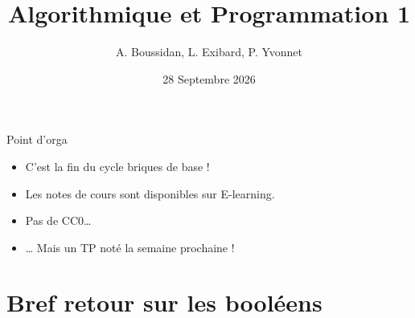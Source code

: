 \documentclass{beamer}
\title{Algorithmique et Programmation 1}
\author{A. Boussidan, L. Exibard, P. Yvonnet}
\date{28 Septembre 2026}
\begin{document}
	\begin{frame}
		\maketitle
	\end{frame}

  \begin{frame}{Point d'orga}

    \begin{itemize}
    \item C'est la fin du cycle \og briques de base\fg{} !
    \item[\MVRightarrow{}] Les notes de cours sont disponibles sur E-learning.
    \item Pas de CC0\dots{} \pause
    \item \dots{} Mais un TP noté la semaine prochaine !
    \end{itemize}

  \end{frame}

  \section{Bref retour sur les booléens}
\end{document}
